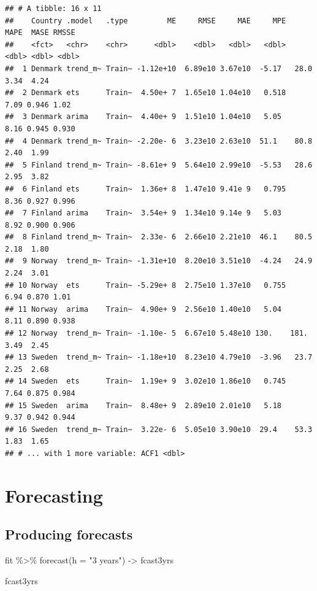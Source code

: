 \documentclass[
]{book}
\newenvironment{Shaded}{\begin{snugshade}}{\end{snugshade}}
\newcommand{\AttributeTok}[1]{\textcolor[rgb]{0.77,0.63,0.00}{#1}}
\newcommand{\FunctionTok}[1]{\textcolor[rgb]{0.00,0.00,0.00}{#1}}
\newcommand{\NormalTok}[1]{#1}
\newcommand{\OtherTok}[1]{\textcolor[rgb]{0.56,0.35,0.01}{#1}}
\newcommand{\SpecialCharTok}[1]{\textcolor[rgb]{0.00,0.00,0.00}{#1}}
\newcommand{\StringTok}[1]{\textcolor[rgb]{0.31,0.60,0.02}{#1}}
\begin{document}
\begin{verbatim}
## # A tibble: 16 x 11
##    Country .model   .type         ME     RMSE     MAE     MPE   MAPE  MASE RMSSE
##    <fct>   <chr>    <chr>      <dbl>    <dbl>   <dbl>   <dbl>  <dbl> <dbl> <dbl>
##  1 Denmark trend_m~ Train~ -1.12e+10  6.89e10 3.67e10  -5.17   28.0  3.34  4.24 
##  2 Denmark ets      Train~  4.50e+ 7  1.65e10 1.04e10   0.518   7.09 0.946 1.02 
##  3 Denmark arima    Train~  4.40e+ 9  1.51e10 1.04e10   5.05    8.16 0.945 0.930
##  4 Denmark trend_m~ Train~ -2.20e- 6  3.23e10 2.63e10  51.1    80.8  2.40  1.99 
##  5 Finland trend_m~ Train~ -8.61e+ 9  5.64e10 2.99e10  -5.53   28.6  2.95  3.82 
##  6 Finland ets      Train~  1.36e+ 8  1.47e10 9.41e 9   0.795   8.36 0.927 0.996
##  7 Finland arima    Train~  3.54e+ 9  1.34e10 9.14e 9   5.03    8.92 0.900 0.906
##  8 Finland trend_m~ Train~  2.33e- 6  2.66e10 2.21e10  46.1    80.5  2.18  1.80 
##  9 Norway  trend_m~ Train~ -1.31e+10  8.20e10 3.51e10  -4.24   24.9  2.24  3.01 
## 10 Norway  ets      Train~ -5.29e+ 8  2.75e10 1.37e10   0.755   6.94 0.870 1.01 
## 11 Norway  arima    Train~  4.90e+ 9  2.56e10 1.40e10   5.04    8.11 0.890 0.938
## 12 Norway  trend_m~ Train~ -1.10e- 5  6.67e10 5.48e10 130.    181.   3.49  2.45 
## 13 Sweden  trend_m~ Train~ -1.18e+10  8.23e10 4.79e10  -3.96   23.7  2.25  2.68 
## 14 Sweden  ets      Train~  1.19e+ 9  3.02e10 1.86e10   0.745   7.64 0.875 0.984
## 15 Sweden  arima    Train~  8.48e+ 9  2.89e10 2.01e10   5.18    9.37 0.942 0.944
## 16 Sweden  trend_m~ Train~  3.22e- 6  5.05e10 3.90e10  29.4    53.3  1.83  1.65 
## # ... with 1 more variable: ACF1 <dbl>
\end{verbatim}

\hypertarget{part-forecasting}{%
\part{Forecasting}\label{part-forecasting}}

\hypertarget{producing-forecasts-1}{%
\chapter{Producing forecasts}\label{producing-forecasts-1}}

\begin{Shaded}
\begin{Highlighting}[]
\NormalTok{fit }\SpecialCharTok{\%\textgreater{}\%} \FunctionTok{forecast}\NormalTok{(}\AttributeTok{h =} \StringTok{"3 years"}\NormalTok{) }\OtherTok{{-}\textgreater{}}\NormalTok{ fcast3yrs}

\NormalTok{fcast3yrs}
\end{Highlighting}
\end{Shaded}
\end{document}

